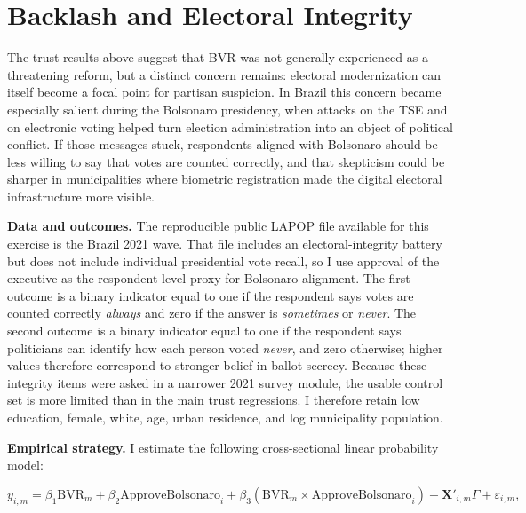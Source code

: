 \section{Backlash and Electoral Integrity}
\label{sec:backlash-integrity}

The trust results above suggest that BVR was not generally experienced as a threatening reform, but a distinct concern remains: electoral modernization can itself become a focal point for partisan suspicion. In Brazil this concern became especially salient during the Bolsonaro presidency, when attacks on the TSE and on electronic voting helped turn election administration into an object of political conflict. If those messages stuck, respondents aligned with Bolsonaro should be less willing to say that votes are counted correctly, and that skepticism could be sharper in municipalities where biometric registration made the digital electoral infrastructure more visible.

\textbf{Data and outcomes.} The reproducible public LAPOP file available for this exercise is the Brazil 2021 wave. That file includes an electoral-integrity battery but does not include individual presidential vote recall, so I use approval of the executive as the respondent-level proxy for Bolsonaro alignment. The first outcome is a binary indicator equal to one if the respondent says votes are counted correctly \emph{always} and zero if the answer is \emph{sometimes} or \emph{never}. The second outcome is a binary indicator equal to one if the respondent says politicians can identify how each person voted \emph{never}, and zero otherwise; higher values therefore correspond to stronger belief in ballot secrecy. Because these integrity items were asked in a narrower 2021 survey module, the usable control set is more limited than in the main trust regressions. I therefore retain low education, female, white, age, urban residence, and log municipality population.

\textbf{Empirical strategy.} I estimate the following cross-sectional linear probability model:

\begin{equation}
\label{eq:lapop-bvr-backlash}
y_{i,m} = \beta_1 \text{BVR}_m + \beta_2 \text{ApproveBolsonaro}_i + \beta_3 \left(\text{BVR}_m \times \text{ApproveBolsonaro}_i\right) + \mathbf{X}'_{i,m}\Gamma + \varepsilon_{i,m},
\end{equation}

